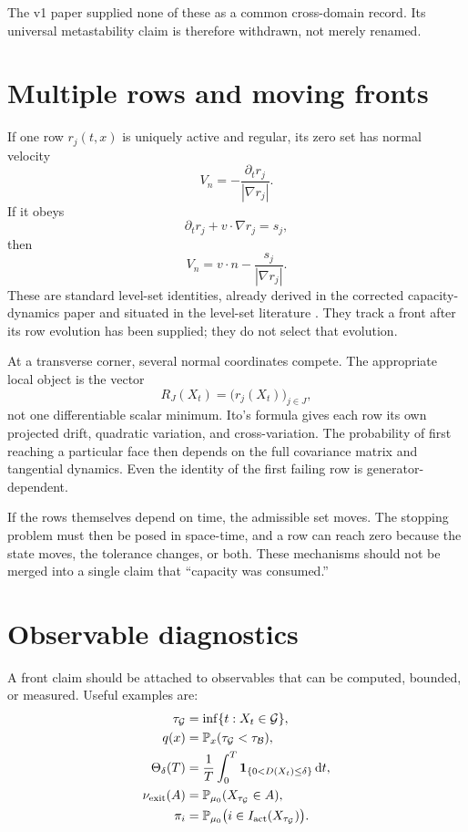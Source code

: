 \documentclass[11pt]{article}
\theoremstyle{definition}
\theoremstyle{remark}
\newcommand{\cB}{\mathcal B}
\newcommand{\cG}{\mathcal G}
\newcommand{\PP}{\mathbb P}
\newcommand{\dd}{\mathrm d}
\begin{document}
The v1 paper supplied none of these as a common cross-domain record.
Its universal metastability claim is therefore withdrawn, not merely
renamed.

\section{Multiple rows and moving fronts}
\label{sec:multiple}

If one row \(r_j(t,x)\) is uniquely active and regular, its zero set has
normal velocity
\[
 V_n=-\frac{\partial_t r_j}{|\nabla r_j|}.
\]
If it obeys
\[
 \partial_t r_j+v\cdot\nabla r_j=s_j,
\]
then
\[
 V_n=v\cdot n-\frac{s_j}{|\nabla r_j|}.
\]
These are standard level-set identities, already derived in the corrected
capacity-dynamics paper and situated in the level-set literature
\cite{CapacityDynamics2026,OsherSethian1988}.  They track a front after its
row evolution has been supplied; they do not select that evolution.

At a transverse corner, several normal coordinates compete.  The
appropriate local object is the vector
\[
 R_J(X_t)=\bigl(r_j(X_t)\bigr)_{j\in J},
\]
not one differentiable scalar minimum.  Ito's formula gives each row its
own projected drift, quadratic variation, and cross-variation.  The
probability of first reaching a particular face then depends on the full
covariance matrix and tangential dynamics.  Even the identity of the
first failing row is generator-dependent.

If the rows themselves depend on time, the admissible set moves.  The
stopping problem must then be posed in space-time, and a row can reach zero
because the state moves, the tolerance changes, or both.  These mechanisms
should not be merged into a single claim that ``capacity was consumed.''

\section{Observable diagnostics}
\label{sec:diagnostics}

A front claim should be attached to observables that can be computed,
bounded, or measured.  Useful examples are:
\[
\begin{aligned}
 \tau_{\cG}
 &=\inf\{t:X_t\in\cG\},\\
 q(x)
 &=\PP_x(\tau_{\cG}<\tau_{\cB}),\\
 \Theta_\delta(T)
 &=\frac1T\int_0^T
   \mathbf1_{\{0<D(X_t)\le\delta\}}\,\dd t,\\
 \nu_{\rm exit}(A)
 &=\PP_{\mu_0}(X_{\tau_{\cG}}\in A),\\
 \pi_i
 &=\PP_{\mu_0}\bigl(i\in I_{\rm act}(X_{\tau_{\cG}})\bigr).
\end{aligned}
\]
\end{document}
